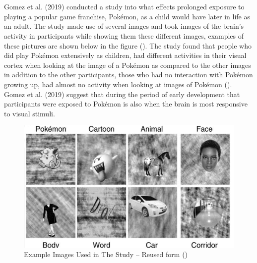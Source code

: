 \\\\
Gomez et al. (2019) conducted a study into what effects prolonged exposure to playing a popular game franchise, Pokémon, as a child would have later in life as an adult. The study made use of several images and took images of the brain’s activity in participants while showing them these different images, examples of these pictures are shown below in the figure (\cite{Gomez2019}). The study found that people who did play Pokémon extensively as children, had different activities in their visual cortex when looking at the image of a Pokémon as compared to the other images in addition to the other participants, those who had no interaction with Pokémon growing up, had almost no activity when looking at images of Pokémon (\cite{Gomez2019}). Gomez et al. (2019) suggest that during the period of early development that participants were exposed to Pokémon is also when the brain is most responsive to visual stimuli.

\begin{figure}[H]
\centering
\centerline{\includegraphics[scale=0.5]{Figures/poke.png}}
\caption{Example Images Used in The Study – Reused form (\cite{Gomez2019})}
\end{figure}


